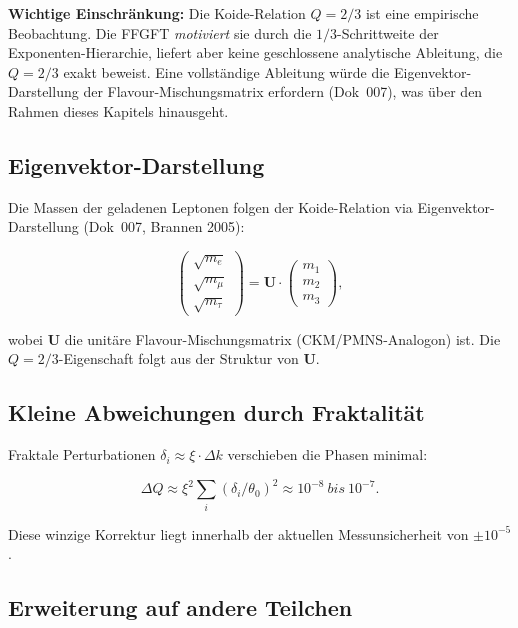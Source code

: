 	\textbf{Wichtige Einschränkung:} Die Koide-Relation \(Q = 2/3\) ist eine empirische Beobachtung. Die FFGFT \emph{motiviert} sie durch die \(1/3\)-Schrittweite der Exponenten-Hierarchie, liefert aber keine geschlossene analytische Ableitung, die \(Q = 2/3\) exakt beweist. Eine vollständige Ableitung würde die Eigenvektor-Darstellung der Flavour-Mischungsmatrix erfordern (Dok~007), was über den Rahmen dieses Kapitels hinausgeht.
	
	\subsection*{Eigenvektor-Darstellung}
	
	Die Massen der geladenen Leptonen folgen der Koide-Relation via Eigenvektor-Darstellung (Dok~007, Brannen 2005):
	
	\begin{equation}
		\begin{pmatrix}
			\sqrt{m_e} \\
			\sqrt{m_\mu} \\
			\sqrt{m_\tau}
		\end{pmatrix}
		= \mathbf{U} \cdot \begin{pmatrix}
			m_1 \\
			m_2 \\
			m_3
		\end{pmatrix},
	\end{equation}
	
	wobei \(\mathbf{U}\) die unitäre Flavour-Mischungsmatrix (CKM/PMNS-Analogon) ist. Die \(Q = 2/3\)-Eigenschaft folgt aus der Struktur von \(\mathbf{U}\).
	
	\subsection*{Kleine Abweichungen durch Fraktalität}
	
	Fraktale Perturbationen \(\delta_i \approx \xi \cdot \Delta k\) verschieben die Phasen minimal:
	
	\begin{equation}
		\Delta Q \approx \xi^2 \sum_i (\delta_i / \theta_0)^2 \approx 10^{-8} \ bis \ 10^{-7}.
	\end{equation}
	
	Diese winzige Korrektur liegt innerhalb der aktuellen Messunsicherheit von \(\pm 10^{-5}\).
	
	\subsection*{Erweiterung auf andere Teilchen}
	
